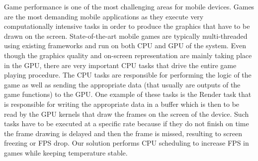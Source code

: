 Game performance is one of the most challenging areas for mobile devices.
Games are the most demanding mobile applications as they execute very computationally intensive tasks in order to produce the graphics that have to be drawn on the screen.
State-of-the-art mobile games are typically multi-threaded using existing frameworks and run on both CPU and GPU of the system.
Even though the graphics quality and on-screen representation are mainly taking place in the GPU, there are very important CPU tasks that drive the entire game playing procedure.
The CPU tasks are responsible for performing the logic of the game as well as sending the appropriate data (that usually are outputs of the game functions) to the GPU.
One example of these tasks is the Render task that is responsible for writing the appropriate data in a buffer which is then to be read by the GPU kernels that draw the frames on the screen of the device.
Such tasks have to be executed at a specific rate because if they do not finish on time the frame drawing is delayed and then the frame is missed, resulting to screen freezing or FPS drop.
Our solution performs CPU scheduling to increase FPS in games while keeping temperature stable.


